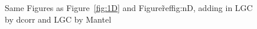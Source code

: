 \documentclass[11pt]{article}
\begin{document}
\begin{figure}[htbp]
\hfil
{}
\caption{Same Figures as Figure~\ref{fig:1D} and Figure\~ref{fig:nD}, adding in LGC by dcorr and LGC by Mantel}
\label{fig:D2}
\end{figure}
\end{document}
